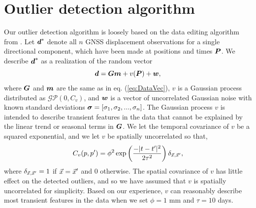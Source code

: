 \documentclass[extra,mreferee]{gji}
\begin{document}
\appendix
\section{Outlier detection algorithm}

Our outlier detection algorithm is loosely based on the data editing
algorithm from \citet{Acheson1975}. Let $\data^*$ denote all $n$ GNSS
displacement observations for a single directional component, which
have been made at positions and times $\points$.  We describe
$\data^*$ as a realization of the random vector
\begin{equation}\label{eq:OutlierDataVec}
\data = \G\mitbf{m} + v(\points) + \mitbf{w},
\end{equation}
where $\G$ and $\mitbf{m}$ are the same as in eq. (\ref{eq:DataVec}),
$v$ is a Gaussian process distributed as $\mathcal{GP}(0,C_v)$, and
$\mitbf{w}$ is a vector of uncorrelated Gaussian noise with known
standard deviations $\mitbf{\sigma} = [\sigma_1, \sigma_2, ...,
\sigma_n]$. The Gaussian process $v$ is intended to describe transient
features in the data that cannot be explained by the linear trend or
seasonal terms in $\G$. We let the temporal covariance of $v$ be a
squared exponential, and we let $v$ be spatially uncorrelated so that,
\begin{equation}
C_v(p,p') = \phi^2\exp\left(\frac{-|t - t'|^2}{2\tau^2}\right) \delta_{\vec{x},\vec{x}'},
\end{equation}
where $\delta_{\vec{x},\vec{x}'} = 1$ if $\vec{x} = \vec{x}'$ and $0$ otherwise.
The spatial covariance of $v$ has little effect on the detected
outliers, and so we have assumed that $v$ is spatially uncorrelated
for simplicity. Based on our experience, $v$ can reasonably describe
most transient features in the data when we set $\phi = 1$ mm and
$\tau = 10$ days.
\end{document}
